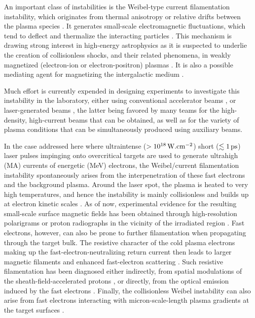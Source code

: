 \documentclass[aps,twocolumn,showpacs,superscriptaddress]{revtex4}
\begin{document}
An important class of instabilities is the Weibel-type current filamentation instability, which originates from thermal anisotropy \cite{PRL_Weibel_1959} or relative drifts between the plasma species \cite{POF_Fried_1959}. It generates small-scale electromagnetic fluctuations, which tend to deflect and thermalize the interacting particles \cite{POF_Davidson_1972, PRL_Lee_1973, PRL_Adam_2006}. This mechanism is drawing strong interest in high-energy astrophysics as it is suspected to underlie the creation of collisionless shocks, and their related phenomena, in weakly magnetized (electron-ion or electron-positron) plasmas \cite{RPP_Marcowith_2016}. It is also a possible mediating agent for magnetizing the intergalactic medium \cite{APJ_Schlickeiser_2003}.

Much effort is currently expended in designing experiments to investigate this instability in the laboratory, either using conventional accelerator beams \cite{PRL_Allen_2012}, or laser-generated beams \cite{PRL_Fox_2013,NP_Huntington_2015},
the latter being favored by many teams for the high-density, high-current beams that can be obtained, as well as for the variety of plasma conditions that can be simultaneously produced using auxiliary beams. 

In the case addressed here where ultraintense ($>10^{18}\,\rm W.cm^{-2}$) short ($\lesssim 1\,\rm ps$) laser pulses impinging onto overcritical targets are used to generate ultrahigh (MA) currents of energetic (MeV) electrons, the Weibel/current filamentation instability spontaneously arises from the interpenetration of these fast electrons and the background plasma. Around the laser spot, the plasma is heated to very high temperatures, and hence the instability is mainly collisionless and builds up at electron kinetic scales \cite{PRL_Adam_2006}. As of now, experimental evidence for the resulting small-scale surface magnetic fields has been obtained through high-resolution polarigrams or proton radiographs in the vicinity of the irradiated region  \cite{PNAS_Mondal_2012, PRL_Romagnani_2019}.
Fast electrons, however, can also be prone to further filamentation when propagating through the target bulk. The resistive character of the cold plasma electrons making up the fast-electron-neutralizing return current \cite{POP_Gremillet_2002} then leads to larger magnetic filaments \cite{JPP_Fiore_2010} and enhanced fast-electron scattering \cite{POP_Yang_2016}. Such resistive filamentation has been diagnosed either indirectly, from spatial modulations of the sheath-field-accelerated protons \cite{PRL_Fuchs_2003, PRL_MacLellan_2013}, or directly, from the optical emission induced by the fast electrons  \cite{PRL_Storm_2009}. Finally, the collisionless Weibel instability can also arise from fast electrons interacting with micron-scale-length plasma gradients at the target surfaces \cite{PRE_Wei_2004, PRL_Quinn_2012, PRL_Gode_2017, NJP_Scott_2017}.
\end{document}
